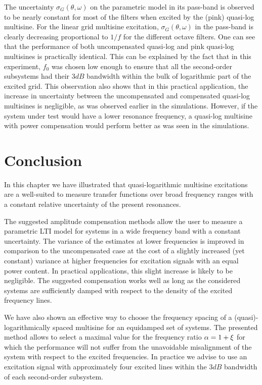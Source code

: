     The uncertainty $\sigma_G\left(\theta,\omega\right)$ on the parametric model in its pass-band is observed to be nearly constant for most of the filters when excited by the (pink) quasi-log multisine.
    For the linear grid multisine excitation, $\sigma_G\left(\theta,\omega\right)$ in the pass-band is clearly decreasing proportional to $1 / f$ for the different octave filters.
    One can see that the performance of both uncompensated quasi-log and pink quasi-log multisines is practically identical.
    This can be explained by the fact that in this experiment, $f_0$ was chosen low enough to ensure that all the second-order subsystems had their $3\unit{dB}$ bandwidth within the bulk of logarithmic part of the excited grid.
    This observation also shows that in this practical application, the increase in uncertainty between the uncompensated and compensated quasi-log multisines is negligible, as was observed earlier in the simulations.
    However, if the system under test would have a lower resonance frequency, a quasi-log multisine with power compensation would perform better as was seen in the simulations.

\section{Conclusion}
\label{sec:excitation:conclusion}
In this chapter we have illustrated that quasi-logarithmic multisine excitations are a well-suited to measure transfer functions over broad frequency ranges with a constant relative uncertainty of the present resonances.

The suggested amplitude compensation methods allow the user to measure a parametric \gls{LTI} model for systems in a wide frequency band with a constant uncertainty.
The variance of the estimates at lower frequencies is improved in comparison to the uncompensated case at the cost of a slightly increased (yet constant) variance at higher frequencies for excitation signals with an equal power content.
In practical applications, this slight increase is likely to be negligible.
The suggested compensation works well as long as the considered systems are sufficiently damped with respect to the density of the excited frequency lines.

We have also shown an effective way to choose the frequency spacing of a (quasi)-logarithmically spaced multisine for an equidamped set of systems.
The presented method allows to select a maximal value for the frequency ratio $\alpha = 1 + \xi$ for which the performance will not suffer from the unavoidable misalignment of the system with respect to the excited frequencies.
In practice we advise to use an excitation signal with approximately four excited lines within the $3\unit{dB}$ bandwidth of each second-order subsystem.


